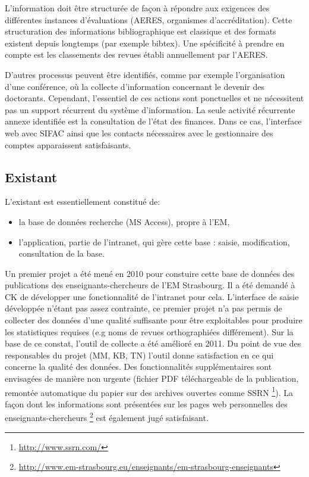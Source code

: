 \documentclass{book}
\begin{document}
L'information doit être structurée de façon à répondre aux exigences des 
différentes instances d'évaluations (AERES, organismes d'accréditation).
Cette structuration des informations bibliographique est classique et des
formats existent depuis longtemps (par exemple bibtex). Une spécificité
à prendre en compte est les classements des revues établi annuellement par 
l'AERES.

D'autres processus peuvent être identifiés, comme par exemple l'organisation
d'une conférence, où la collecte d'information concernant le devenir des
doctorants. Cependant, l'essentiel de ces actions sont ponctuelles et ne 
nécessitent pas un support récurrent du système d'information. La seule 
activité récurrente annexe identifiée est la consultation de l'état des 
finances. Dans ce cas, l'interface web avec SIFAC ainsi que les contacts 
nécessaires avec le gestionnaire des comptes apparaissent satisfaisants.



\subsection{Existant}
L'existant est essentiellement constitué de:
\begin{itemize}
\item la base de données recherche (MS Access), propre à l'EM,
\item l'application, partie de l'intranet, qui gère cette base : saisie, 
modification, consultation de la base.
\end{itemize}
Un premier projet a été mené en 2010 pour constuire cette base de données des
publications des enseignants-chercheurs de l'EM Strasbourg. Il a été demandé à 
CK de développer une fonctionnalité de l'intranet pour cela. L'interface de 
saisie développée n'étant pas assez contrainte, ce premier projet n'a pas 
permis de collecter des données d'une qualité suffisante pour être exploitables
pour produire les statistiques requises (e.g noms de revues orthographiées 
différement). Sur la base de ce constat, l'outil de collecte a été amélioré en 
2011. Du point de vue des responsables du projet (MM, KB, TN) l'outil donne 
satisfaction en ce qui concerne la qualité des données. Des fonctionnalités 
supplémentaires sont envisagées de manière non urgente (fichier PDF téléchargeable 
de la publication, remontée automatique du papier sur des archives ouvertes comme SSRN%
\footnote{\url{ http://www.ssrn.com/}}).
La façon dont les informations sont présentées sur les pages web personnelles
des enseignants-chercheurs%
\footnote{\url{http://www.em-strasbourg.eu/enseignants/em-strasbourg-enseignants}}
est également jugé satisfaisant.
\end{document}
